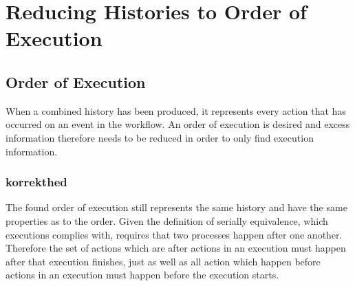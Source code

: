 \chapter{Reducing Histories to Order of Execution}
\label{chap:order-of-execution}
\section{Order of Execution}
	When a combined history has been produced, it represents every action that has occurred on an event in the workflow. 
	An order of execution is desired and excess information therefore needs to be reduced in order to only find execution information. 
	
	\subsection{korrekthed}
	The found order of execution still represents the same history and have the same properties as to the order. Given the definition of serially equivalence, which executions complies with, requires that two processes happen after one another. Therefore the set of actions which are after actions in an execution must happen after that execution finishes, just as well as all action which happen before actions in an execution must happen before the execution starts. 
	
	
	
